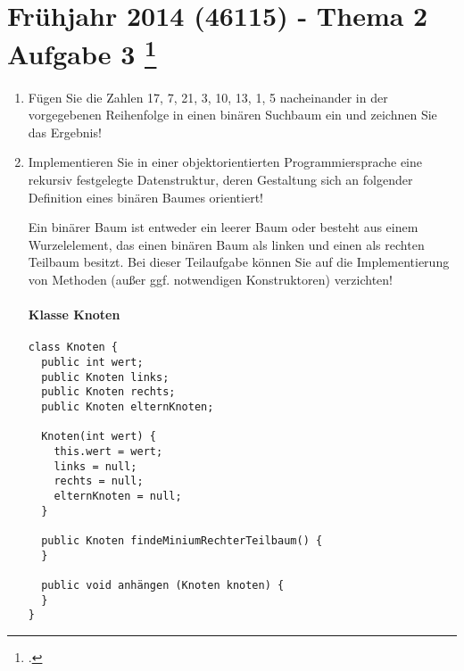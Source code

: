 \documentclass{lehramt-informatik-aufgabe}
\begin{document}

\section{Frühjahr 2014 (46115) - Thema 2 Aufgabe 3
\footcite{examen:46115:2014:09}}

\begin{enumerate}


\item Fügen Sie die Zahlen 17, 7, 21, 3, 10, 13, 1, 5 nacheinander in
der vorgegebenen Reihenfolge in einen binären Suchbaum ein und zeichnen
Sie das Ergebnis!

\begin{center}
\end{center}


\item Implementieren Sie in einer objektorientierten Programmiersprache
eine rekursiv festgelegte Datenstruktur, deren Gestaltung sich an
folgender Definition eines binären Baumes orientiert!

Ein binärer Baum ist entweder ein leerer Baum oder besteht aus einem
Wurzelelement, das einen binären Baum als linken und einen als rechten
Teilbaum besitzt. Bei dieser Teilaufgabe können Sie auf die
Implementierung von Methoden (außer ggf. notwendigen Konstruktoren)
verzichten!

\paragraph{Klasse Knoten}

\begin{verbatim}
class Knoten {
  public int wert;
  public Knoten links;
  public Knoten rechts;
  public Knoten elternKnoten;

  Knoten(int wert) {
    this.wert = wert;
    links = null;
    rechts = null;
    elternKnoten = null;
  }

  public Knoten findeMiniumRechterTeilbaum() {
  }

  public void anhängen (Knoten knoten) {
  }
}
\end{verbatim}


\end{enumerate}
\end{document}
